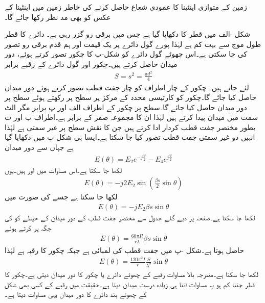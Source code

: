 زمین کے متوازی اینٹینا کا عمودی شعاع حاصل کرنے کی خاطر زمین میں اینٹینا کے عکس کو بھی مد نظر رکھا جائے گا۔

شکل -الف میں  قطر کا  دکھایا گیا ہے جس میں  برقی رو گزر رہی ہے۔ دائرے کا قطر طول موج سے بہت کم  ہے لہٰذا پورے گول دائرے پر یک قیمت اور ہم قدم برقی رو تصور کی جا سکتی ہے۔اس چھوٹے گول دائرے کو شکل-ب کا چکور تصور کرتے ہوئے، دور میدان حاصل کرتے ہیں۔چکور اور گول دائرے کے رقبے  برابر
\begin{align}
S=s^2=\frac{\pi d^2}{4} 
\end{align}
لئے جاتے ہیں۔ چکور کے چار اطراف کو چار جفت قطب تصور کرتے ہوئے دور میدان حاصل کیا جائے گا۔چکور کو کارتیسی محدد کے مرکز پر  سطح پر رکھتے ہوئے  سطح پر دور میدان حاصل کیا جائے گا۔سطح  پر چکور کے اطراف الف اور پ برابر مگر الٹ سمت میں میدان پیدا کرتے ہیں لہٰذا ان کا مجموعہ صفر کے برابر ہے۔اطراف ب اور ت بطور مختصر جفت قطب کردار ادا کرتے ہیں جن کا نقش  سطح پر غیر سمتی ہے لہٰذا انہیں دو غیر سمتی جفت قطب تصور کیا جا سکتا ہے۔ایسا ہی شکل-پ میں دکھایا گیا ہے جہاں سے دور میدان
\begin{align*}
E(\theta)=E_2 e^{-j\frac{\psi}{2}}-E_4e^{j\frac{\psi}{2}}
\end{align*}
لکھا جا سکتا ہے۔اس مساوات میں  اور  ہیں۔یوں
\begin{align*}
E(\theta)=-j 2 E_2 \sin\left(\frac{\beta s}{2}\sin \theta \right) 
\end{align*}
لکھا جا سکتا ہے جسے  کی صورت میں
\begin{align}
E(\theta)=-j E_2 \beta s \sin \theta
\end{align}
لکھا جا سکتا ہے۔صفحہ  پر دیے گئے جدول  سے مختصر جفت قطب کے دور میدان  کے حیطے کو  کی جگہ پر کرتے ہوئے
\begin{align}
E(\theta)=\frac{60 \pi I l}{r \lambda} \beta s \sin \theta
\end{align}
حاصل ہوتا ہے۔شکل -پ میں جفت قطب کی لمبائی  ہے جبکہ چکور کا رقبہ  ہے لہٰذا
\begin{align}
E(\theta)=\frac{120 \pi^2 I}{r} \frac{S}{\lambda^2}\sin \theta
\end{align}
لکھا جا سکتا ہے۔مندرجہ بالا مساوات  رقبے کے چھوٹے دائرے یا چکور کا دور میدان دیتی ہے۔چکور کا قطر جتنا کم ہو یہ مساوات اتنا ہی زیادہ درست میدان دیتا ہے۔حقیقت میں  رقبے کے کسی بھی شکل کے چھوٹے بند دائرے کا دور میدان یہی مساوات دیتا ہے۔  

